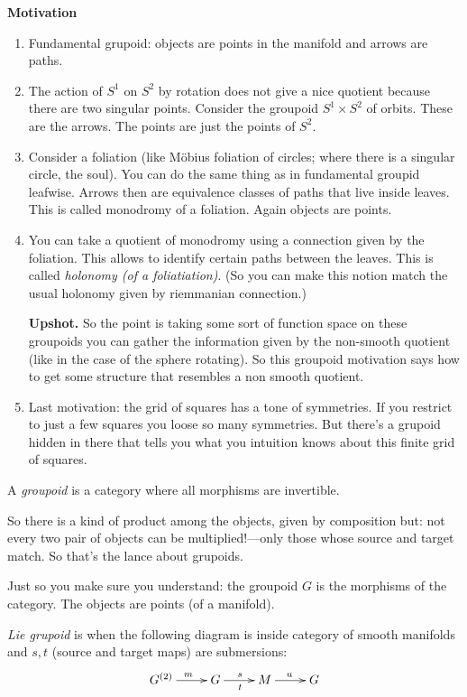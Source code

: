 \medskip\noindent
{\bf Motivation}
\begin{enumerate}
\item Fundamental grupoid: objects are points
in the manifold and arrows are paths.
\item The action of \(S^1\) on \(S^2\) by
rotation does not give a nice quotient
because there are two singular points.
Consider the groupoid  \(S^1 \times S^2\) of
orbits. These are the arrows. The points are
just the points of \(S^2\).
\item Consider a foliation (like Möbius
foliation of circles; where there is a
singular circle, the soul). You can do the
same thing as in fundamental groupid
leafwise. Arrows then are equivalence classes
of paths that live inside leaves. This is
called monodromy of a foliation. Again
objects are points.
\item You can take a quotient of monodromy
using a connection given by the foliation.
This allows to identify certain paths between
the leaves. This is called {\it holonomy (of
a foliatiation)}. (So you can make this
notion match the usual holonomy given by
riemmanian connection.)

{\bf Upshot.}
	So the point is taking some sort of function
	space on these groupoids you can gather the
	information given by the non-smooth quotient
	(like in the case of the sphere rotating).
	So this groupoid motivation says how to get
	some structure that resembles a non smooth
	quotient.
\item Last motivation: the grid of squares
has a tone of symmetries. If you restrict to
just a few squares you loose so many
symmetries. But there's a grupoid hidden in
there that tells you what you intuition knows
about this finite grid of squares.
\end{enumerate}

\begin{definition}
A {\it groupoid} is a category where all
morphisms are invertible.
\end{definition}

So there is a kind of product among the
objects, given by composition but:
 not every two pair of objects can be
 multiplied!---only those whose
source and target match. So that's the lance
about grupoids.

Just so you make sure you understand: the
groupoid \(G\) is the morphisms of the
category. The objects are points (of a
manifold).

\begin{definition}
{\it Lie grupoid} is when the following
diagram is inside category of smooth
manifolds and \(s,t\) (source and target
maps) are submersions:
$$
\xymatrix{
G^{(2)}\ar[r]^m& G\ar[r]^ s_t & M\ar[r]^u&G
}
$$
\end{definition}

